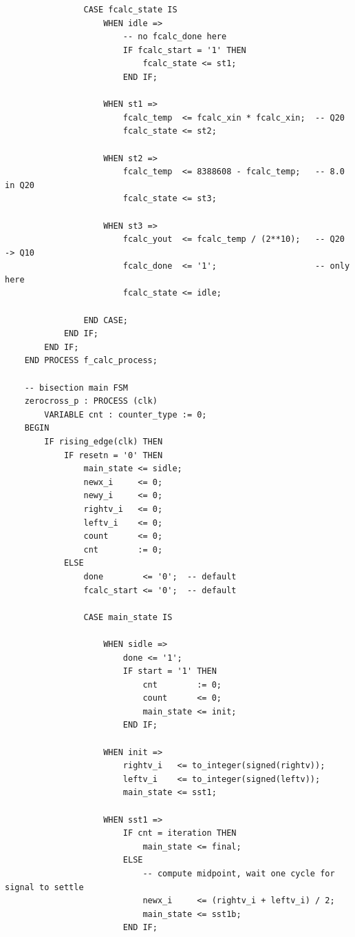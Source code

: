 \documentclass[11pt, a4paper]{report}
\begin{document}
\begin{verbatim}
                CASE fcalc_state IS
                    WHEN idle =>
                        -- no fcalc_done here
                        IF fcalc_start = '1' THEN
                            fcalc_state <= st1;
                        END IF;

                    WHEN st1 =>
                        fcalc_temp  <= fcalc_xin * fcalc_xin;  -- Q20
                        fcalc_state <= st2;

                    WHEN st2 =>
                        fcalc_temp  <= 8388608 - fcalc_temp;   -- 8.0 in Q20
                        fcalc_state <= st3;

                    WHEN st3 =>
                        fcalc_yout  <= fcalc_temp / (2**10);   -- Q20 -> Q10
                        fcalc_done  <= '1';                    -- only here
                        fcalc_state <= idle;

                END CASE;
            END IF;
        END IF;
    END PROCESS f_calc_process;

    -- bisection main FSM
    zerocross_p : PROCESS (clk)
        VARIABLE cnt : counter_type := 0;
    BEGIN
        IF rising_edge(clk) THEN
            IF resetn = '0' THEN
                main_state <= sidle;
                newx_i     <= 0;
                newy_i     <= 0;
                rightv_i   <= 0;
                leftv_i    <= 0;
                count      <= 0;
                cnt        := 0;
            ELSE
                done        <= '0';  -- default
                fcalc_start <= '0';  -- default

                CASE main_state IS

                    WHEN sidle =>
                        done <= '1';
                        IF start = '1' THEN
                            cnt        := 0;
                            count      <= 0;
                            main_state <= init;
                        END IF;

                    WHEN init =>
                        rightv_i   <= to_integer(signed(rightv));
                        leftv_i    <= to_integer(signed(leftv));
                        main_state <= sst1;

                    WHEN sst1 =>
                        IF cnt = iteration THEN
                            main_state <= final;
                        ELSE
                            -- compute midpoint, wait one cycle for signal to settle
                            newx_i     <= (rightv_i + leftv_i) / 2;
                            main_state <= sst1b;
                        END IF;


\end{verbatim}
\end{document}
